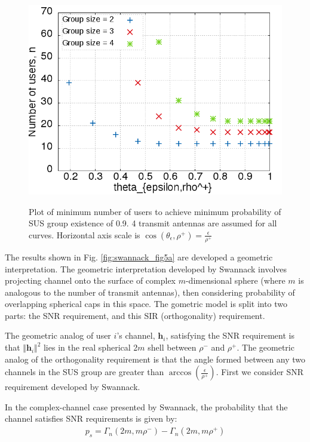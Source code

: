 \begin{figure}
    \includegraphics[width=12cm]{figs/existence.png}\\
    \caption{Plot of minimum number of users to achieve minimum probability of SUS group existence of 0.9. 4 transmit antennas are assumed for all curves. Horizontal axis scale is $\cos{(\theta_\epsilon,\rho^+)} = \frac{\epsilon}{\rho^+}$}
    \label{fig:reproduce_fig5a}
\end{figure}

The results shown in Fig. \ref{fig:swannack_fig5a} are developed a geometric interpretation. The geometric interpretation developed by Swannack involves projecting channel onto the surface of complex $m$-dimensional sphere (where $m$ is analogous to the number of transmit antennas), then considering probability of overlapping spherical caps in this space. The gometric model is split into two parts: the SNR requirement, and this SIR (orthogonality) requirement.

The geometric analog of user $i$'s channel, $\textbf{h}_i$, satisfying the SNR requirement is that $\Vert\textbf{h}_i\Vert^2$ lies in the real spherical 2$m$ shell between $\rho^-$ and $\rho^+$. The geometric analog of the orthogonality requirement is that the angle formed between any two channels in the SUS group are greater than $\arccos{(\frac{\epsilon}{\rho^+})}$. First we consider SNR requirement developed by Swannack.

In the complex-channel case presented by Swannack, the probability that the channel satisfies SNR requirements is given by:
\begin{equation}\label{eq:p_s}
    \begin{aligned}
        p_s = \Gamma_n(2m,m\rho^-) - \Gamma_n(2m,m\rho^+)
    \end{aligned}
\end{equation}

